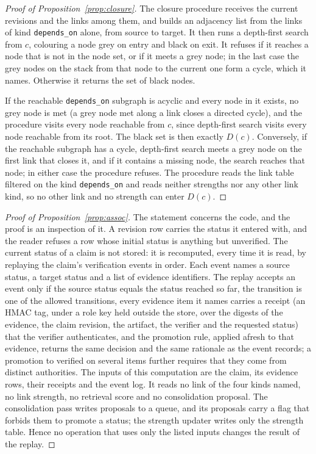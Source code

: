 \begin{proof}[Proof of Proposition~\ref{prop:closure}]\label{proof:prop:closure}
The closure procedure receives the current revisions and the links among them, and builds an adjacency list from the links of kind \texttt{depends\_on} alone, from source to target. It then runs a depth-first search from $c$, colouring a node grey on entry and black on exit. It refuses if it reaches a node that is not in the node set, or if it meets a grey node; in the last case the grey nodes on the stack from that node to the current one form a cycle, which it names. Otherwise it returns the set of black nodes.

If the reachable \texttt{depends\_on} subgraph is acyclic and every node in it exists, no grey node is met (a grey node met along a link closes a directed cycle), and the procedure visits every node reachable from $c$, since depth-first search visits every node reachable from its root. The black set is then exactly $D(c)$. Conversely, if the reachable subgraph has a cycle, depth-first search meets a grey node on the first link that closes it, and if it contains a missing node, the search reaches that node; in either case the procedure refuses. The procedure reads the link table filtered on the kind \texttt{depends\_on} and reads neither strengths nor any other link kind, so no other link and no strength can enter $D(c)$.
\end{proof}

\begin{proof}[Proof of Proposition~\ref{prop:assoc}]\label{proof:prop:assoc}
The statement concerns the code, and the proof is an inspection of it. A revision row carries the status it entered with, and the reader refuses a row whose initial status is anything but \textsf{unverified}. The current status of a claim is not stored: it is recomputed, every time it is read, by replaying the claim's verification events in order. Each event names a source status, a target status and a list of evidence identifiers. The replay accepts an event only if the source status equals the status reached so far, the transition is one of the allowed transitions, every evidence item it names carries a receipt (an HMAC tag, under a role key held outside the store, over the digests of the evidence, the claim revision, the artifact, the verifier and the requested status) that the verifier authenticates, and the promotion rule, applied afresh to that evidence, returns the same decision and the same rationale as the event records; a promotion to \textsf{verified} on several items further requires that they come from distinct authorities. The inputs of this computation are the claim, its evidence rows, their receipts and the event log. It reads no link of the four kinds named, no link strength, no retrieval score and no consolidation proposal. The consolidation pass writes proposals to a queue, and its proposals carry a flag that forbids them to promote a status; the strength updater writes only the strength table. Hence no operation that uses only the listed inputs changes the result of the replay.
\end{proof}

